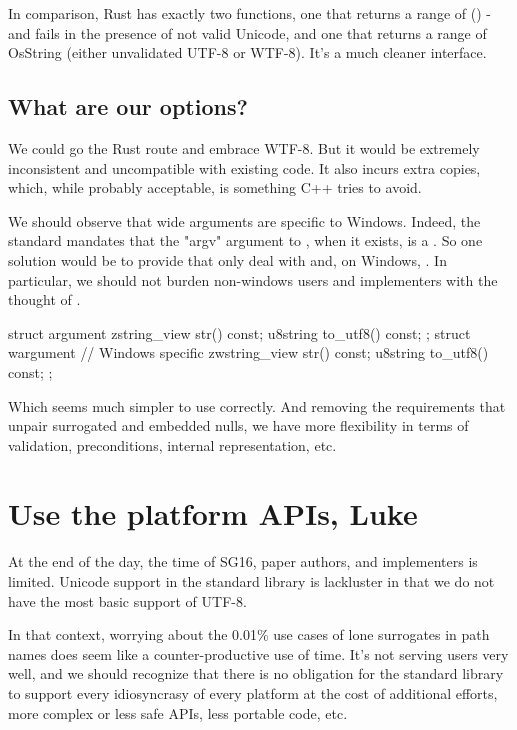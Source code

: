 \documentclass{wg21}
\begin{document}
In comparison, Rust has exactly two functions, one that returns a range of  () - and fails in the presence of not valid Unicode, and one that returns a range of OsString (either unvalidated UTF-8 or WTF-8). It's a much cleaner interface.

\subsection{What are our options?}

We could go the Rust route and embrace WTF-8. But it would be extremely inconsistent and uncompatible with existing code.
It also incurs extra copies, which, while probably acceptable, is something C++ tries to avoid.

We should observe that wide arguments are specific to Windows. Indeed, the standard mandates that the "argv" argument to , when it exists, is a .
So one solution would be to provide  that only deal with  and, on Windows, .
In particular, we should not burden non-windows users and implementers with the thought of .

\begin{colorblock}
struct argument {
    zstring_view str() const;
    u8string to_utf8() const;
};
struct wargument { // Windows specific
    zwstring_view str() const;
    u8string to_utf8()  const;
};
\end{colorblock}

Which seems much simpler to use correctly. And removing the requirements that unpair surrogated and embedded nulls,
we have more flexibility in terms of validation, preconditions, internal representation, etc.

\section{Use the platform APIs, Luke}

At the end of the day, the time of SG16, paper authors, and implementers is limited.
Unicode support in the standard library is lackluster in that we do not have the most basic support of UTF-8.

In that context, worrying about the 0.01\% use cases of lone surrogates in path names does seem like a counter-productive use of time. It's not serving users very well, and we should recognize that there is no obligation
for the standard library to support every idiosyncrasy of every platform at the cost of additional efforts, more complex or less safe APIs,
less portable code, etc.
\end{document}
